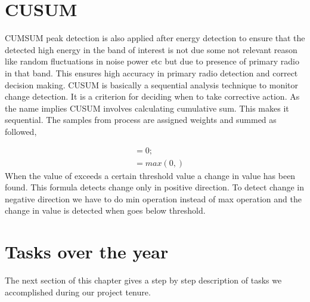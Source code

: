 \section{CUSUM}
CUMSUM peak detection is also applied after energy detection to ensure that the
detected high energy in the band of interest is not due some  not relevant 
reason like random fluctuations in noise power etc but due to presence of 
primary radio in that band. This ensures high accuracy in primary radio 
detection and correct decision making.
CUSUM is basically a sequential analysis technique to monitor change detection. 
It is a criterion for deciding when to take corrective action. As the name 
implies CUSUM involves calculating cumulative sum. This makes it sequential. 
The samples from process  are assigned weights  and summed as followed,

\begin{align}
~ &=0; \nonumber \\
~ &=max(0,) \nonumber
\end{align}
When the value of  exceeds a certain threshold value a change  in value has 
been found. This formula detects change only in positive direction. To detect 
change in negative direction we have to do min operation instead of max 
operation and the change in value is detected when goes below threshold.







\section{Tasks over the year}
The next section of this chapter gives a step by step description of tasks we 
accomplished during our project tenure. 

